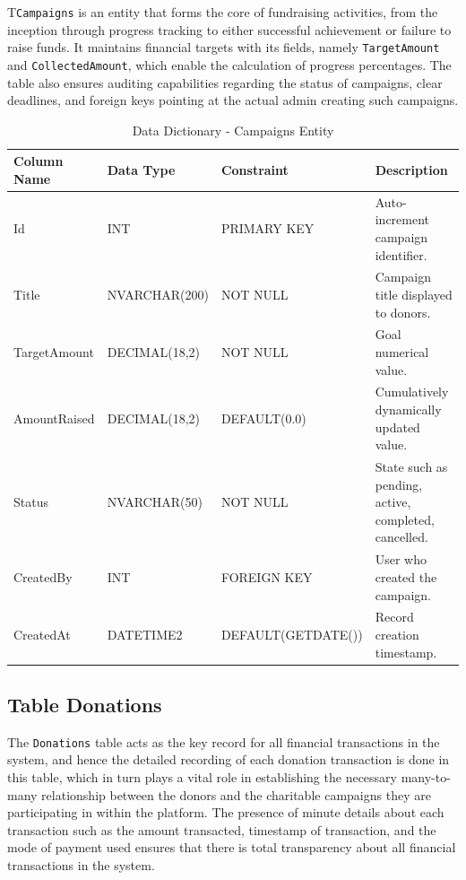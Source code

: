 \documentclass{thesis-library}
\begin{document}
T\texttt{Campaigns} is an entity that forms the core of fundraising activities, from the inception through progress tracking to either successful achievement or failure to raise funds. It maintains financial targets with its fields, namely \texttt{TargetAmount} and \texttt{CollectedAmount}, which enable the calculation of progress percentages. The table also ensures auditing capabilities regarding the status of campaigns, clear deadlines, and foreign keys pointing at the actual admin creating such campaigns.

\begin{table}[H]
    \centering
    \caption{Data Dictionary - Campaigns Entity}
    \vspace{10pt}
    \begin{tabularx}{\linewidth}{|l|l|l|L|}
        \hline
        \textbf{Column Name} & \textbf{Data Type} & \textbf{Constraint} & \textbf{Description} \\
        \hline
        Id & INT & PRIMARY KEY & Auto-increment campaign identifier. \\
        \hline
        Title & NVARCHAR(200) & NOT NULL & Campaign title displayed to donors. \\
        \hline
        TargetAmount & DECIMAL(18,2) & NOT NULL & Goal numerical value. \\
        \hline
        AmountRaised & DECIMAL(18,2) & DEFAULT(0.0) & Cumulatively dynamically updated value. \\
        \hline
        Status & NVARCHAR(50) & NOT NULL & State such as pending, active, completed, cancelled. \\
        \hline
        CreatedBy & INT & FOREIGN KEY & User who created the campaign. \\
        \hline
        CreatedAt & DATETIME2 & DEFAULT(GETDATE()) & Record creation timestamp. \\
        \hline
    \end{tabularx}
\end{table}

\subsection{Table Donations}

The \texttt{Donations} table acts as the key record for all financial transactions in the system, and hence the detailed recording of each donation transaction is done in this table, which in turn plays a vital role in establishing the necessary many-to-many relationship between the donors and the charitable campaigns they are participating in within the platform. The presence of minute details about each transaction such as the amount transacted, timestamp of transaction, and the mode of payment used ensures that there is total transparency about all financial transactions in the system.
\end{document}
